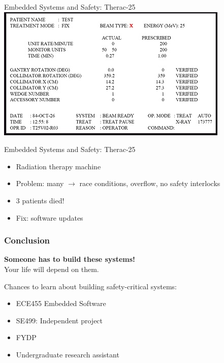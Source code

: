 \documentclass{beamer}
\begin{document}
\begin{frame}{Embedded Systems and Safety: Therac-25}
\centering
\includegraphics[width=0.8\linewidth]{img/Xraybad.jpg}
\end{frame} 

\begin{frame}{Embedded Systems and Safety: Therac-25}
  \begin{itemize}
  \item Radiation therapy machine
  \item Problem: \alert{many} $\rightarrow$ race conditions, overflow,
    no safety interlocks
  \item 3 patients died!
  \item Fix: software updates
  \end{itemize}



\end{frame}

\begin{frame}[c]
  \frametitle{Conclusion}
  \textbf{\Large Someone has to build these systems!} \\
  Your life will depend on them.

  \pause

   \vspace{2em}
   Chances to learn about building safety-critical systems: \\
   \begin{itemize}
   \item ECE455 Embedded Software
   \item SE499: Independent project
   \item FYDP
   \item Undergraduate research assistant
   \end{itemize}
\end{frame}
\end{document}
